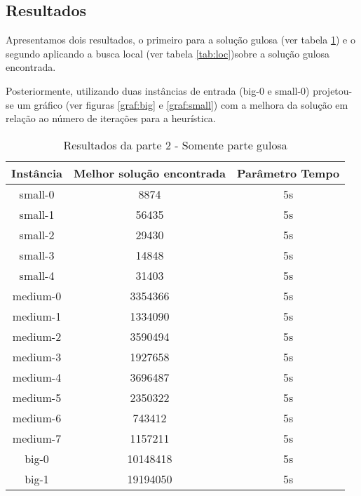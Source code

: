 \documentclass[11pt,letterpaper]{article}
\begin{document}
\subsection{Resultados}

Apresentamos dois resultados, o primeiro para a solução gulosa (ver
tabela \ref{tab:gul}) e o segundo
aplicando a busca local (ver
tabela \ref{tab:loc})sobre a solução gulosa encontrada.

Posteriormente, utilizando duas instâncias de entrada (big-0 e
small-0) projetou-se um gráfico (ver figuras  \ref{graf:big} e \ref{graf:small}) com a melhora da
solução em relação ao número de iterações para a heurística.
 
\addtocounter{footnote}{1}

\begin{table}[h!]
\begin{centering}
\begin{tabular}{|c|c|c|}
\hline 
Instância & Melhor solução encontrada & Parâmetro Tempo  \tabularnewline
\hline 
\hline 
small-0 & 8874 & 5s \tabularnewline %
\hline 
small-1 & 56435 & 5s  \tabularnewline %
\hline 
small-2 & 29430 & 5s \tabularnewline %
\hline 
small-3 & 14848 & 5s \tabularnewline %
\hline 
small-4 & 31403 & 5s \tabularnewline %
\hline 
medium-0 & 3354366 & 5s \tabularnewline %
\hline 
medium-1 & 1334090 & 5s \tabularnewline %
\hline 
medium-2 & 3590494 & 5s \tabularnewline %
\hline 
medium-3 & 1927658 & 5s \tabularnewline %
\hline 
medium-4 & 3696487 & 5s \tabularnewline %
\hline 
medium-5 & 2350322 & 5s \tabularnewline %
\hline 
medium-6 & 743412 & 5s \tabularnewline %
\hline 
medium-7 & 1157211 & 5s \tabularnewline %
\hline 
big-0 & 10148418 & 5s \tabularnewline %
\hline 
big-1 & 19194050 & 5s \tabularnewline %
\hline 

\end{tabular}
\par\end{centering}
\caption{Resultados da parte 2 - Somente parte gulosa}
\label{tab:gul}
\end{table}
\end{document}
